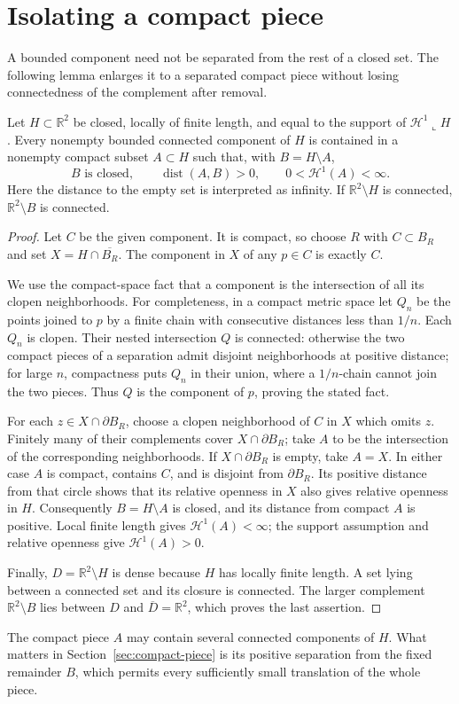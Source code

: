 \section{Isolating a compact piece}
\label{sec:isolation}
A bounded component need not be separated from the rest of a closed set.
The following lemma enlarges it to a separated compact piece without
losing connectedness of the complement after removal.

\begin{lemma}
\label{lem:compact-isolation}
Let $H\subset\mathbb R^2$ be closed, locally of finite length, and equal to the
support of $\mathcal H^1\!\llcorner H$.  Every nonempty bounded connected
component of $H$ is contained in a nonempty compact subset $A\subset H$ such
that, with $B=H\setminus A$,
\[
 B\text{ is closed},\qquad
 \operatorname{dist}(A,B)>0,\qquad
 0<\mathcal H^1(A)<\infty.
\]
Here the distance to the empty set is interpreted as infinity.  If
$\mathbb R^2\setminus H$ is connected, $\mathbb R^2\setminus B$ is connected.
\end{lemma}

\begin{proof}
Let $C$ be the given component.  It is compact, so choose $R$ with
$C\subset B_R$ and set $X=H\cap\overline{B_R}$.  The component in $X$ of any
$p\in C$ is exactly $C$.

We use the compact-space fact that a component is the intersection of all its
clopen neighborhoods.  For completeness, in a compact metric space let $Q_n$
be the points joined to $p$ by a finite chain with consecutive distances less
than $1/n$.  Each $Q_n$ is clopen.  Their nested intersection $Q$ is connected:
otherwise the two compact pieces of a separation admit disjoint neighborhoods
at positive distance; for large $n$, compactness puts $Q_n$ in their union,
where a $1/n$-chain cannot join the two pieces.  Thus $Q$ is the component of
$p$, proving the stated fact.

For each $z\in X\cap\partial B_R$, choose a clopen neighborhood of $C$ in
$X$ which omits $z$.  Finitely many of their complements cover
$X\cap\partial B_R$; take $A$ to be the intersection of the corresponding
neighborhoods.  If $X\cap\partial B_R$ is empty, take $A=X$.  In either case
$A$ is compact, contains $C$, and is disjoint from $\partial B_R$.  Its positive
distance from that circle shows that its relative openness in $X$ also gives
relative openness in $H$.  Consequently $B=H\setminus A$ is closed, and its
distance from compact $A$ is positive.  Local finite length gives
$\mathcal H^1(A)<\infty$; the support assumption and relative openness give
$\mathcal H^1(A)>0$.

Finally, $D=\mathbb R^2\setminus H$ is dense because $H$ has locally finite
length.  A set lying between a connected set and its closure is connected.
The larger complement $\mathbb R^2\setminus B$ lies between $D$ and
$\overline D=\mathbb R^2$, which proves the last assertion.
\end{proof}


The compact piece $A$ may contain several connected components of $H$.
What matters in Section~\ref{sec:compact-piece} is its positive separation
from the fixed remainder $B$, which permits every sufficiently small
translation of the whole piece.
